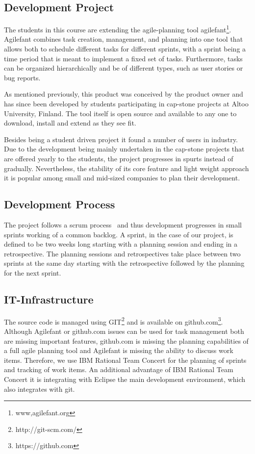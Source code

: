 \subsection{Development Project}
\label{chap:make:subset:devproject}
The students in this course are extending the agile-planning tool agilefant\footnote{www,agilefant.org}.
Agilefant combines task creation, management, and planning into one tool that allows both to schedule different tasks for different sprints, with a sprint being a time period that is meant to implement a fixed set of tasks.
Furthermore, tasks can be organized hierarchically and be of different types, such as user stories or bug reports.
 
As mentioned previously, this product was conceived by the product owner and has since been developed by students participating in cap-stone projects at Altoo University, Finland.
The tool itself is open source and available to any one to download, install and extend as they see fit.

Besides being a student driven project it found a number of users in industry.
Due to the development being mainly undertaken in the cap-stone projects that are offered yearly to the students, the project progresses in spurts instead of gradually.
Nevertheless, the stability of its core feature and light weight approach it is popular among small and mid-sized companies to plan their development.

\subsection{Development Process}
The project follows a scrum process~\cite{} and thus development progresses in small sprints working of a common backlog.
A sprint, in the case of our project, is defined to be two weeks long starting with a planning session and ending in a retrospective.
The planning sessions and retrospectives take place between two sprints at the same day starting with the retrospective followed by the planning for the next sprint.

\subsection{IT-Infrastructure}
The source code is managed using GIT\footnote{http://git-scm.com/} and is available on github.com\footnote{https://github.com}.
Although Agilefant or github.com issues can be used for task management both are missing important features, github.com is missing the planning capabilities of a full agile planning tool and Agilefant is missing the ability to discuss work items.
Therefore, we use IBM Rational Team Concert for the planning of sprints and tracking of work items.
An additional advantage of IBM Rational Team Concert it is integrating with Eclipse the main development environment, which also integrates with git. 

